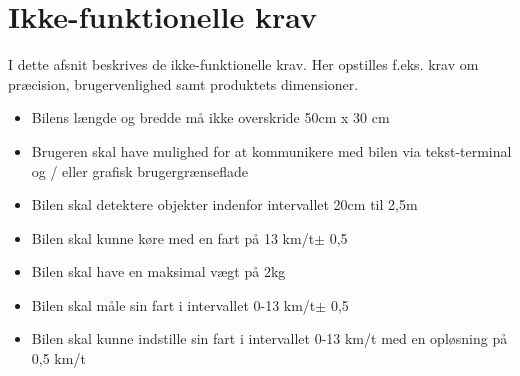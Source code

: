 \section{Ikke-funktionelle krav}
I dette afsnit beskrives de ikke-funktionelle krav. Her opstilles f.eks. krav om præcision, brugervenlighed samt produktets dimensioner.
\begin{itemize}
			\item Bilens længde og bredde må ikke overskride 50cm x 30 cm
			\item Brugeren skal have mulighed for at kommunikere med bilen via tekst-terminal og / eller grafisk brugergrænseflade
			\item Bilen skal detektere objekter indenfor intervallet 20cm til 2,5m
			\item Bilen skal kunne køre med en fart på 13 km/t$\pm$ 0,5 
			\item Bilen skal have en maksimal vægt på 2kg
			\item Bilen skal måle sin fart i intervallet 0-13 km/t$\pm$ 0,5
			\item Bilen skal kunne indstille sin fart i intervallet 0-13 km/t med en opløsning på 0,5 km/t	
\end{itemize}
